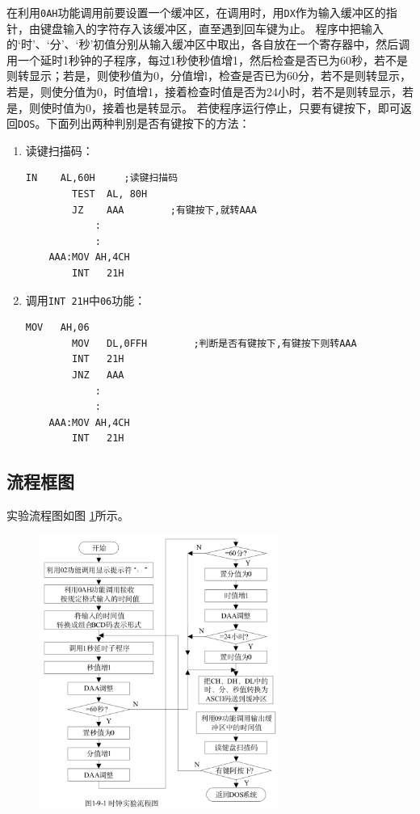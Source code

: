 \documentclass[11pt]{SEU-Digital-Report}
\begin{document}
在利用\texttt{0AH}功能调用前要设置一个缓冲区，在调用时，用\texttt{DX}作为输入缓冲区的指针，由键盘输入的字符存入该缓冲区，直至遇到回车键为止。
程序中把输入的‘时’、‘分’、‘秒’初值分别从输入缓冲区中取出，各自放在一个寄存器中，然后调用一个延时1秒钟的子程序，每过1秒使秒值增1，然后检查是否已为60秒，若不是则转显示；若是，则使秒值为0，分值增l，检查是否已为60分，若不是则转显示，若是，则使分值为0，时值增1，接着检查时值是否为24小时，若不是则转显示，若是，则使时值为0，接着也是转显示。
若使程序运行停止，只要有键按下，即可返回\texttt{DOS}。下面列出两种判别是否有键按下的方法：
\begin{enumerate}
    \item 读键扫描码：\\
\begin{lstlisting}[language={[x86masm]Assembler},title=code]
        IN    AL,60H     ;读键扫描码
        TEST  AL, 80H  
        JZ    AAA        ;有键按下,就转AAA
            :
            :
    AAA:MOV AH,4CH
        INT   21H  
\end{lstlisting}
    \item 调用\texttt{INT 21H}中\texttt{06}功能：\\
\begin{lstlisting}[language={[x86masm]Assembler},title=code]
        MOV   AH,06
        MOV   DL,0FFH        ;判断是否有键按下,有键按下则转AAA
        INT   21H   
        JNZ   AAA
            :
            :
    AAA:MOV AH,4CH
        INT   21H
\end{lstlisting}
\end{enumerate}

\subsection{流程框图}
实验流程图如图 \ref{fig:process}所示。
\begin{figure}[htbp]
    \centering
    \includegraphics[width=0.7\textwidth]{fig/process.png}
    \caption{}
    \label{fig:process}
\end{figure}
\end{document}

